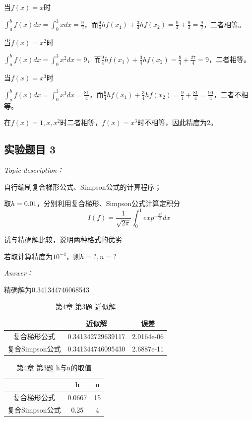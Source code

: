 \documentclass[12pt]{ctexart}
\begin{document}
	当$f(x)=x$时
	
	$\int_{a}^{b}f(x)dx=\int_{0}^{3}xdx=\frac{9}{2}$，而$\frac{9}{4}hf(x_1)+\frac{3}{4}hf(x_2)=\frac{9}{4}+\frac{9}{4}=\frac{9}{2}$，二者相等。
	
	当$f(x)=x^2$时
	
	$\int_{a}^{b}f(x)dx=\int_{0}^{3}x^2dx=9$，而$\frac{9}{4}hf(x_1)+\frac{3}{4}hf(x_2)=\frac{9}{4}+\frac{27}{4}=9$，二者相等。
	
	当$f(x)=x^3$时
	
	$\int_{a}^{b}f(x)dx=\int_{0}^{3}x^3dx=\frac{81}{4}$，而$\frac{9}{4}hf(x_1)+\frac{3}{4}hf(x_2)=\frac{9}{4}+\frac{81}{4}=\frac{90}{4}$，二者不相等。
	
	在$f(x)=1,x,x^2$时二者相等，$f(x)=x^3$时不相等，因此精度为2。
	
	\subsection{实验题目 3}
	\textit{Topic description：}
	
	自行编制复合梯形公式、Simpson公式的计算程序；
	
	取$h=0.01$，分别利用复合梯形、Simpson公式计算定积分
	\begin{equation*}
	I(f)=\frac{1}{\sqrt{2\pi}}\int_0^1exp^{-\frac{x^2}{2}}dx
	\end{equation*}
	
	试与精确解比较，说明两种格式的优劣
	
	若取计算精度为$10^{-4}$，则$h=?,n=?$
	
	\textit{Answer：}
	
	精确解为0.341344746068543
	\begin{table}[htbp]
		\centering
		\caption{第4章 第3题 近似解}\label{e4_3_1}
		\begin{tabular}
			{c|c|c}
			\hline
			&近似解&误差 \\
			\hline
			复合梯形公式&0.341342729639117&2.0164e-06 \\
			\hline
			复合Simpson公式&0.341344746095430&2.6887e-11 \\
			\hline
		\end{tabular}
	\end{table}
	
	\begin{table}[htbp]
		\centering
		\caption{第4章 第3题 h与n的取值}\label{e4_3_2}
		\begin{tabular}
			{c|c|c}
			\hline
			&h&n \\
			\hline
			复合梯形公式&0.0667&15 \\
			\hline
			复合Simpson公式&0.25&4 \\
			\hline
		\end{tabular}
	\end{table}
	
\end{document}
